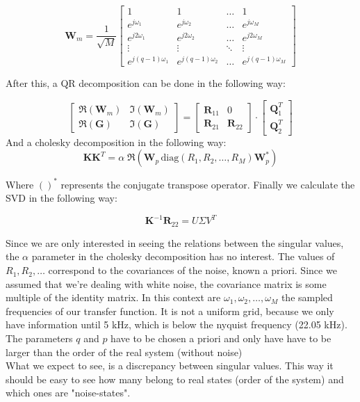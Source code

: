 \[
\textbf{W}_m = \frac{1}{\sqrt{M}}
\begin{bmatrix}
1 & 1 & \dots & 1 \\
e^{j\omega_1} & e^{j\omega_2} & \dots & e^{j\omega_M} \\
e^{j2\omega_1} & e^{j2\omega_2} & \dots & e^{j2\omega_M} \\
\vdots & \vdots & \ddots & \vdots \\
e^{j(q-1)\omega_1} &e^{j(q-1)\omega_2} & \dots & e^{j(q-1)\omega_M} 
\end{bmatrix}\]

After this, a QR decomposition can be done in the following way:

\[\begin{bmatrix}
\Re(\textbf{W}_m) & \Im(\textbf{W}_m) \\
\Re(\textbf{G}) & \Im(\textbf{G})
\end{bmatrix} = 
\begin{bmatrix}
\textbf{R}_{11} & 0 \\
\textbf{R}_{21} & \textbf{R}_{22}
\end{bmatrix}\cdot
\begin{bmatrix}
\textbf{Q}_1^T \\
\textbf{Q}_2^T
\end{bmatrix}
\]
And a cholesky decomposition in the following way:
\[\textbf{K}\textbf{K}^T = \alpha\;\Re(\textbf{W}_p\,\text{diag}(R_1,R_2,\dots, R_M)\textbf{W}_p^*)\]

Where $()^*$ represents the conjugate transpose operator. Finally we calculate the SVD in the following way:

\[\textbf{K}^{-1}\textbf{R}_{22} = U\Sigma V^T\]

Since we are only interested in seeing the relations between the singular values, the $\alpha$ parameter in the cholesky decomposition has no interest. The values of $R_1, R_2, \dots$ correspond to the covariances of the noise, known a priori. Since we assumed that we're dealing with white noise, the covariance matrix is some multiple of the identity matrix. In this context are $\omega_1, \omega_2,\dots,\omega_M$ the sampled frequencies of our transfer function. It is not a uniform grid, because we only have information until 5 kHz, which is below the nyquist frequency (22.05 kHz). The parameters $q$ and $p$ have to be chosen a priori and only have have to be larger than the order of the real system (without noise)\\

What we expect to see, is a discrepancy between singular values. This way it should be easy to see how many belong to real states (order of the system) and which ones are "noise-states".

